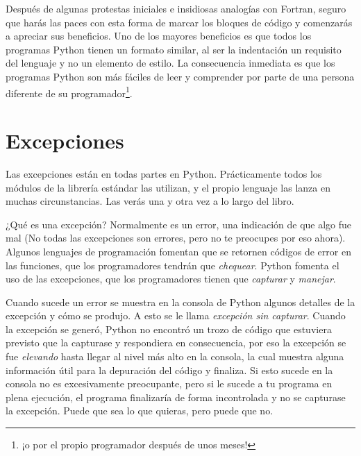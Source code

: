 Después de algunas protestas iniciales e insidiosas analogías con Fortran, seguro que harás las paces con esta forma de marcar los bloques de código y comenzarás a apreciar sus beneficios. Uno de los mayores beneficios es que todos los programas Python tienen un formato similar, al ser la indentación un requisito del lenguaje y no un elemento de estilo. La consecuencia inmediata es que los programas Python son más fáciles de leer y comprender por parte de una persona diferente de su programador\footnote{¡o por el propio programador después de unos meses!}.

\section{Excepciones}

Las excepciones están en todas partes en Python. Prácticamente todos los módulos de la librería estándar las utilizan, y el propio lenguaje las lanza en muchas circunstancias. Las verás una y otra vez a lo largo del libro.

¿Qué es una excepción? Normalmente es un error, una indicación de que algo fue mal (No todas las excepciones son errores, pero no te preocupes por eso ahora). Algunos lenguajes de programación fomentan que se retornen códigos de error en las funciones, que los programadores tendrán que \emph{chequear}. Python fomenta el uso de las excepciones, que los programadores tienen que \emph{capturar} y \emph{manejar}.


Cuando sucede un error se muestra en la consola de Python algunos detalles de la excepción y cómo se produjo. A esto se le llama \emph{excepción sin capturar}. Cuando la excepción se generó, Python no encontró un trozo de código que estuviera previsto que la capturase y respondiera en consecuencia, por eso la excepción se fue \emph{elevando} hasta llegar al nivel más alto en la consola, la cual muestra alguna información útil para la depuración del código y finaliza. Si esto sucede en la consola no es excesivamente preocupante, pero si le sucede a tu programa en plena ejecución, el programa finalizaría de forma incontrolada y no se capturase la excepción. Puede que sea lo que quieras, pero puede que no.


